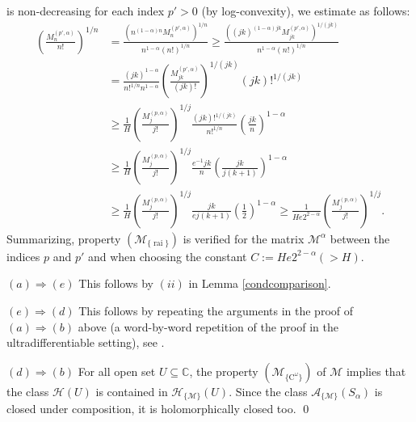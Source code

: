 \documentclass[11pt,a4paper]{article}
\theoremstyle{plain}
\theoremstyle{definition}
\newcommand{\CC}{\mathbb{C}}
\newcommand{\red}[1]{{\color{red}#1}}
\let\on=\operatorname
\begin{document}
is non-decreasing for each index $p'>0$ (by log-convexity), we estimate as follows:
\begin{align*}
	 \left(\frac{M^{(p',\alpha)}_{n}}{n!}\right)^{1/n}& =\frac{(n^{(1-\alpha)n}M^{(p',\alpha)}_{n})^{1/n}}{n^{1-\alpha}(n!)^{1/n}} \ge%
	 \frac{((jk)^{(1-\alpha)jk}M^{(p',\alpha)}_{jk})^{1/(jk)}}{n^{1-\alpha}(n!)^{1/n}}
	\\&
	 =\frac{(jk)^{1-\alpha}}{n!^{1/n}n^{1-\alpha}} \left(\frac{M^{(p',\alpha)}_{jk}}{(jk)!}\right)^{1/(jk)}(jk)!^{1/(jk)}\\
&\ge\frac{1}{H}\left(\frac{M^{(p,\alpha)}_j}{j!}\right)^{1/j} \frac{(jk)!^{1/(jk)}}{n!^{1/n}}\left(\frac{jk}{n}\right)^{1-\alpha}
	\\&
	 \ge\frac{1}{H}\left(\frac{M^{(p,\alpha)}_j}{j!}\right)^{1/j} \frac{e^{-1}jk}{n}\left(\frac{jk}{j(k+1)}\right)^{1-\alpha}\\
&\ge\frac{1}{H}\left(\frac{M^{(p,\alpha)}_j}{j!}\right)^{1/j} \frac{jk}{ej(k+1)}\left(\frac{1}{2}\right)^{1-\alpha}	 \ge\frac{1}{He2^{2-\alpha}}\left(\frac{M^{(p,\alpha)}_j}{j!}\right)^{1/j}.
\end{align*}
Summarizing, property \hyperlink{R-rai}{$(\mathcal{M}_{\{\on{rai}\}})$} is verified for the matrix $\mathcal{M}^{\alpha}$ between the indices $p$ and $p'$ and when choosing the constant $C:=He2^{2-\alpha}(>H)$.\vspace{6pt}

$(a)\Rightarrow(e)$ This follows by $(ii)$ in Lemma \ref{condcomparison}.\vspace{6pt}

$(e)\Rightarrow(d)$ This follows by repeating the arguments in the proof of $(a)\Rightarrow(b)$ above (a word-by-word repetition of the proof in the ultradifferentiable setting), see \cite[Thm. 8.3.1]{dissertation}.\vspace{6pt}

$(d)\Rightarrow(b)$
For all open set $U\subseteq \CC$, the property \hyperlink{R-Comega}{$(\mathcal{M}_{\{\text{C}^{\omega}\}})$} of $\mathcal{M}$ implies that the class $\mathcal{H}(U)$ is contained in $\mathcal{H}_{\{\mathcal{M}\}}(U)$. Since the class $\mathcal{A}_{\{\mathcal{M}\}}(S_{\alpha})$ is closed under composition, it is holomorphically closed too.
\qed\enddemo
\end{document}
